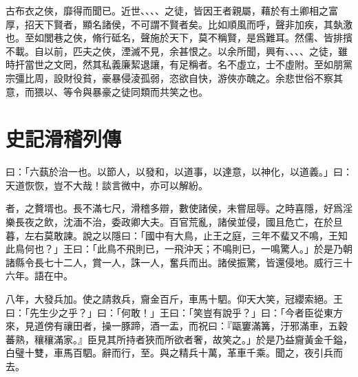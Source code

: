 古布衣之俠，靡得而聞已。近世、、、、之徒，皆因王者親屬，藉於有土卿相之富厚，招天下賢者，顯名諸侯，不可謂不賢者矣。比如順風而呼，聲非加疾，其埶激也。至如閭巷之俠，脩行砥名，聲施於天下，莫不稱賢，是爲難耳。然儒、皆排擯不載。自以前，匹夫之俠，湮滅不見，余甚恨之。以余所聞，興有、、、、之徒，雖時扞當世之文罔，然其私義廉絜退讓，有足稱者。名不虛立，士不虛附。至如朋黨宗彊比周，設財役貧，豪暴侵淩孤弱，恣欲自快，游俠亦醜之。余悲世俗不察其意，而猥以、等令與暴豪之徒同類而共笑之也。

\theendnotes

\section[滑稽列傳\quad{\small 史記}]{{\normalsize 史記}\quad 滑稽列傳}
曰：「六蓺於治一也。以節人，以發和，以道事，以達意，以神化，以道義。」曰：天道恢恢，豈不大哉！談言微中，亦可以解紛。

者，之贅壻也。長不滿七尺，滑稽多辯，數使諸侯，未嘗屈辱。之時喜隱，好爲淫樂長夜之飲，沈湎不治，委政卿大夫。百官荒亂，諸侯並侵，國且危亡，在於旦暮，左右莫敢諫。說之以隱曰：「國中有大鳥，止王之庭，三年不蜚又不鳴，王知此鳥何也？」王曰：「此鳥不飛則已，一飛沖天；不鳴則已，一鳴驚人。」於是乃朝諸縣令長七十二人，賞一人，誅一人，奮兵而出。諸侯振驚，皆還侵地。威行三十六年。語在中。

八年，大發兵加。使之請救兵，齎金百斤，車馬十駟。仰天大笑，冠纓索絕。王曰：「先生少之乎？」曰：「何敢！」王曰：「笑豈有說乎？」曰：「今者臣從東方來，見道傍有禳田者，操一豚蹄，酒一盂，而祝曰：『甌窶滿篝，汙邪滿車，五穀蕃熟，穰穰滿家。』臣見其所持者狹而所欲者奢，故笑之。」於是乃益齎黃金千鎰，白璧十雙，車馬百駟。辭而行，至。與之精兵十萬，革車千乘。聞之，夜引兵而去。

